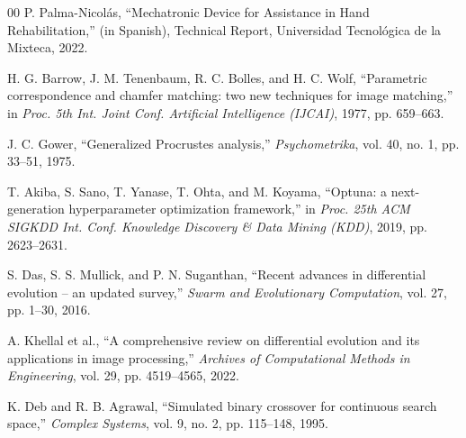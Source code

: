 \begin{thebibliography}{00}
 P. Palma-Nicol\'as,
``Mechatronic Device for Assistance in Hand Rehabilitation,'' (in Spanish),
Technical Report, Universidad Tecnol\'ogica de la Mixteca, 2022.

 H. G. Barrow, J. M. Tenenbaum, R. C. Bolles, and H. C. Wolf,
``Parametric correspondence and chamfer matching: two new techniques for image matching,''
in \textit{Proc. 5th Int. Joint Conf. Artificial Intelligence (IJCAI)}, 1977, pp. 659--663.

 J. C. Gower,
``Generalized Procrustes analysis,''
\textit{Psychometrika}, vol. 40, no. 1, pp. 33--51, 1975.

 T. Akiba, S. Sano, T. Yanase, T. Ohta, and M. Koyama,
``Optuna: a next-generation hyperparameter optimization framework,'' in
\textit{Proc. 25th ACM SIGKDD Int. Conf. Knowledge Discovery \& Data Mining
(KDD)}, 2019, pp. 2623--2631.

 S. Das, S. S. Mullick, and P. N. Suganthan,
``Recent advances in differential evolution -- an updated survey,''
\textit{Swarm and Evolutionary Computation}, vol. 27, pp. 1--30, 2016.

 A. Khellal et al.,
``A comprehensive review on differential evolution and its applications in image
processing,'' \textit{Archives of Computational Methods in Engineering},
vol. 29, pp. 4519--4565, 2022.

 K. Deb and R. B. Agrawal,
``Simulated binary crossover for continuous search space,''
\textit{Complex Systems}, vol. 9, no. 2, pp. 115--148, 1995.

\end{thebibliography}
